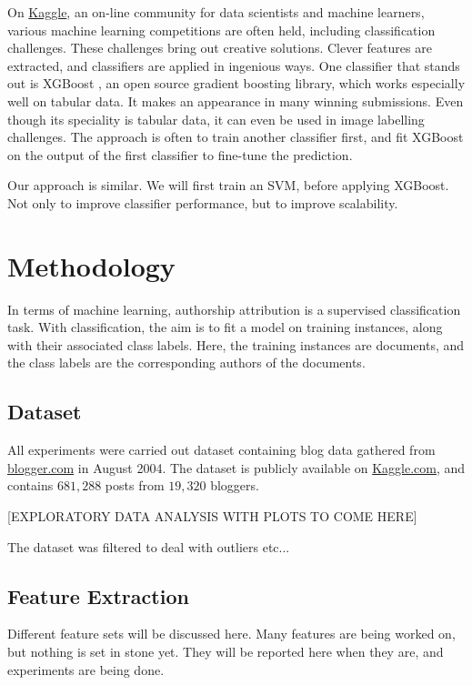 \documentclass[twocolumn, 12pt]{article}
\begin{document}
On \href{kaggle.com}{Kaggle}, an on-line community for data scientists and machine learners, various machine learning competitions are often held, including classification challenges.
These challenges bring out creative solutions.
Clever features are extracted, and classifiers are applied in ingenious ways.
One classifier that stands out is XGBoost \cite{xgboost}, an open source gradient boosting library, which works especially well on tabular data.
It makes an appearance in many winning submissions.
Even though its speciality is tabular data, it can even be used in image labelling challenges.
The approach is often to train another classifier first, and fit XGBoost on the output of the first classifier to fine-tune the prediction.

Our approach is similar.
We will first train an SVM, before applying XGBoost.
Not only to improve classifier performance, but to improve scalability.

\section{Methodology}
In terms of machine learning, authorship attribution is a supervised classification task.
With classification, the aim is to fit a model on training instances, along with their associated class labels.
Here, the training instances are documents, and the class labels are the corresponding authors of the documents.

\subsection{Dataset}
All experiments were carried out dataset containing blog data gathered from \href{blogger.com}{blogger.com} in August 2004.
The dataset is publicly available on \href{https://www.kaggle.com/rtatman/blog-authorship-corpus}{Kaggle.com}, and contains $681,288$ posts from $19,320$ bloggers.

[EXPLORATORY DATA ANALYSIS WITH PLOTS TO COME HERE]

The dataset was filtered to deal with outliers etc...

\subsection{Feature Extraction}
Different feature sets will be discussed here.
Many features are being worked on, but nothing is set in stone yet.
They will be reported here when they are, and experiments are being done.
\end{document}
